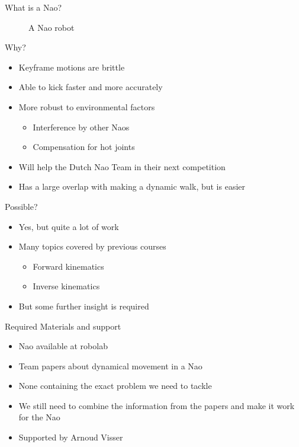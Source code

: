 \documentclass{beamer}
\begin{document}
\begin{frame}{What is a Nao?}
\begin{figure}[H]
\begin{center}
            \caption{A Nao robot}
        \end{center}
    \end{figure}  
\end{frame}

\begin{frame}{Why?}
    \begin{itemize}
        \item{Keyframe motions are brittle}
        \item{Able to kick faster and more accurately}
        \item{More robust to environmental factors}
            \begin{itemize}
                \item{Interference by other Naos}
                \item{Compensation for hot joints}
            \end{itemize} 
        \item{Will help the Dutch Nao Team in their next competition}
        \item{Has a large overlap with making a dynamic walk, but is easier}
    \end{itemize}
\end{frame}

\begin{frame}{Possible?}
    \begin{itemize}
        \item{Yes, but quite a lot of work}
        \item{Many topics covered by previous courses}
            \begin{itemize}
                \item{Forward kinematics}
                \item{Inverse kinematics}
            \end{itemize}
        \item{But some further insight is required}
    \end{itemize}
\end{frame}

\begin{frame}{Required Materials and support}
    \begin{itemize}
        \item{Nao available at robolab}
        \item{Team papers about dynamical movement in a Nao} 
        \item{None containing the exact problem we need to tackle}
        \item{We still need to combine the information from the papers and make
            it work for the Nao} 

        \item{Supported by Arnoud Visser}
    \end{itemize}
\end{frame}
\end{document}
